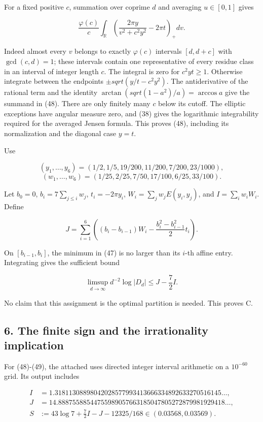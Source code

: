 \documentclass[11pt,a4paper]{article}
\begin{document}
For a fixed positive \(c\), summation over coprime \(d\) and averaging \(u∈[0,1]\) gives

\[
\frac{\varphi(c)}c\int_{\mathbb R}
\left(\frac{2\pi y}{v^2+c^2y^2}-2\pi t\right)_+dv.
\]

Indeed almost every \(v\) belongs to exactly \(φ(c)\) intervals \([d,d+c]\) with \(\operatorname{gcd}(c,d)=1\); these intervals contain one representative of every residue class in an interval of integer length \(c\). The integral is zero for \(c^{2}yt≥1\). Otherwise integrate between the endpoints \(±sqrt(y/t-c^{2}y^{2})\). The antiderivative of the rational term and the identity \(\operatorname{arctan}(sqrt(1-a^{2})/a)=\operatorname{arccos} a\) give the summand in (48). There are only finitely many \(c\) below its cutoff. The elliptic exceptions have angular measure zero, and (38) gives the logarithmic integrability required for the averaged Jensen formula. This proves (48), including its normalization and the diagonal case \(y=t\).

Use

\[
(y_1,\ldots,y_6)=(1/2,1/5,19/200,11/200,7/200,23/1000),
\] \[
(w_1,\ldots,w_6)=(1/25,2/25,7/50,17/100,6/25,33/100).
\]

Let \(b_{0}=0\), \(b_i=7\sum _{j≤i}w_j\), \(t_i=-2πy_i\), \(W_i=\sum _jw_jE(y_i,y_j)\), and \(I=\sum _iw_iW_i\). Define

\[
J=\sum_{i=1}^6\left((b_i-b_{i-1})W_i-\frac{b_i^2-b_{i-1}^2}{2}t_i\right).\tag{49}
\]

On \([b_{i-1},b_i]\), the minimum in (47) is no larger than its \(i\)-th affine entry. Integrating gives the sufficient bound

\[
\limsup_{d\to\infty}d^{-2}\log|D_d|\le J-\frac72I.\tag{C}
\]

No claim that this assignment is the optimal partition is needed. This proves C.

\hypertarget{the-finite-sign-and-the-irrationality-implication}{%
\subsection{6. The finite sign and the irrationality implication}\label{the-finite-sign-and-the-irrationality-implication}}

For (48)-(49), the attached  uses directed integer interval arithmetic on a \(10^{-60}\) grid. Its output includes

\[
\begin{aligned}
I&=1.31811308898042028577993413666334892633270516145\ldots,\\
J&=14.88875588544755989057663185047805272879981929418\ldots,\\
S&:=43\log7+\tfrac72 I-J-12325/168
\in(0.03568,0.03569).
\end{aligned}
\tag{50}\]
\end{document}
